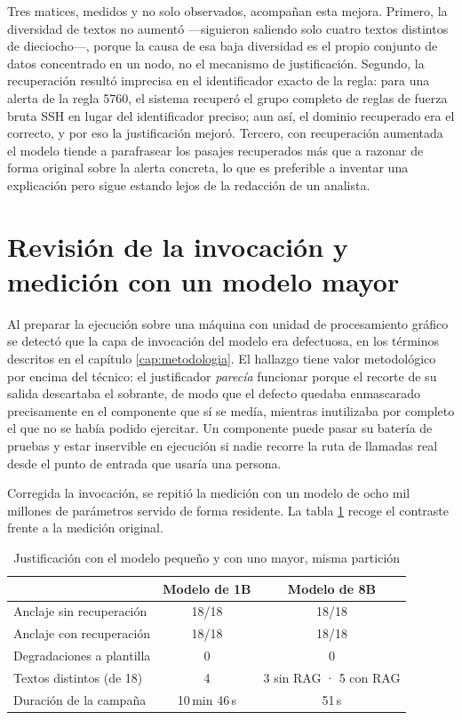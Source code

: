 Tres matices, medidos y no solo observados, acompañan esta mejora. Primero, la diversidad de textos
no aumentó ---siguieron saliendo solo cuatro textos distintos de dieciocho---, porque la causa de
esa baja diversidad es el propio conjunto de datos concentrado en un nodo, no el mecanismo de
justificación. Segundo, la recuperación resultó imprecisa en el identificador exacto de la regla:
para una alerta de la regla 5760, el sistema recuperó el grupo completo de reglas de fuerza bruta
SSH en lugar del identificador preciso; aun así, el dominio recuperado era el correcto, y por eso
la justificación mejoró. Tercero, con recuperación aumentada el modelo tiende a parafrasear los
pasajes recuperados más que a razonar de forma original sobre la alerta concreta, lo que es
preferible a inventar una explicación pero sigue estando lejos de la redacción de un analista.

\section{Revisión de la invocación y medición con un modelo mayor}
\label{sec:invocacion}

Al preparar la ejecución sobre una máquina con unidad de procesamiento gráfico se detectó que la
capa de invocación del modelo era defectuosa, en los términos descritos en el capítulo
\ref{cap:metodologia}. El hallazgo tiene valor metodológico por encima del técnico: el justificador
\emph{parecía} funcionar porque el recorte de su salida descartaba el sobrante, de modo que el
defecto quedaba enmascarado precisamente en el componente que sí se medía, mientras inutilizaba por
completo el que no se había podido ejercitar. Un componente puede pasar su batería de pruebas y
estar inservible en ejecución si nadie recorre la ruta de llamadas real desde el punto de entrada
que usaría una persona.

Corregida la invocación, se repitió la medición con un modelo de ocho mil millones de parámetros
servido de forma residente. La tabla \ref{tab:modelo-mayor} recoge el contraste frente a la
medición original.

\begin{table}[H]
  \centering
  \caption{Justificación con el modelo pequeño y con uno mayor, misma partición}
  \label{tab:modelo-mayor}
  \begin{tabular}{@{}p{}cc@{}}
    \toprule
    & \textbf{Modelo de 1B} & \textbf{Modelo de 8B} \\
    \midrule
    Anclaje sin recuperación & 18/18 & 18/18 \\
    Anclaje con recuperación & 18/18 & 18/18 \\
    Degradaciones a plantilla & 0 & 0 \\
    Textos distintos (de 18) & 4 & 3 sin RAG · 5 con RAG \\
    Duración de la campaña & 10\,min 46\,s & 51\,s \\
    \bottomrule
  \end{tabular}
\end{table}

